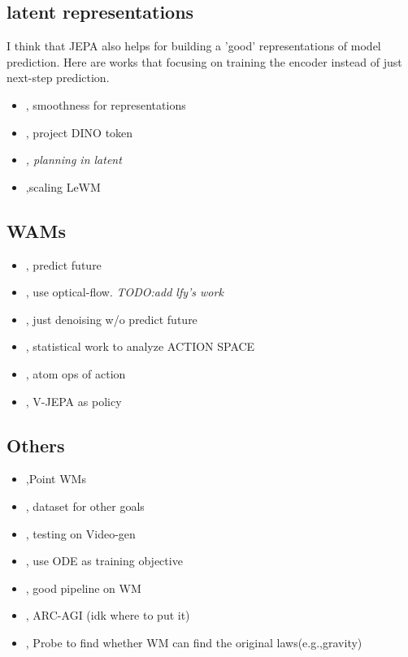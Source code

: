 \subsection{latent representations}
I think that JEPA also helps for building a 'good' representations of model prediction. Here are works that focusing on training the encoder instead of just next-step prediction.
\begin{itemize}
    \item \cite{wang2026temporal}, smoothness for representations
    \item \cite{liu2026odeworld}, project DINO token
    \item  \textit{\cite{yuan2026representation}, planning in latent}
    \item \cite{zholus2026robojepa},scaling LeWM 
\end{itemize}
\subsection{WAMs}
\begin{itemize}
    \item \cite{zhang2026imagewam}, predict future
    \item \cite{chen2026flowwam}, use optical-flow. \textit{TODO:add lfy's work}
    \item \cite{wang2026beyond}, just denoising w/o predict future
    \item \cite{xie2026sensorimotor}, statistical work to analyze ACTION SPACE
    \item \cite{baek2026learning,liu2026physical}, atom ops of action
    \item \cite{zhang2026vjepa}, V-JEPA as policy
\end{itemize}
\subsection{Others}
\begin{itemize}
    \item \cite{daniel2026latent},Point WMs
    \item \cite{nam2026anygoal}, dataset for other goals
    \item \cite{guo2026scaling}, testing on Video-gen
    \item \cite{liu2026odeworld}, use ODE as training objective
    \item \cite{huang2026nano}, good pipeline on WM
    \item \cite{liu2026reasoning,hu2025arc},  ARC-AGI (idk where to put it)
    \item \cite{vafa2025what}, Probe to find whether WM can find the original laws(e.g.,gravity)
\end{itemize}
